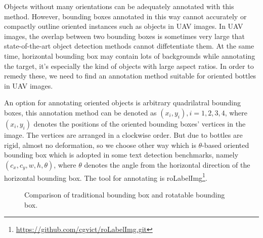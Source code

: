 Objects without many orientations can be adequately annotated with this method. However, bounding boxes annotated in this way cannot accurately or compactly outline oriented instances such as objects in UAV images. In UAV images, the overlap between two bounding boxes is sometimes very large that state-of-the-art object detection methods cannot diffetentiate them\cite{DOTA}. At the same time, horizontal bounding box may contain lots of backgrounds while annotating the target, it's especially the kind of objects with large aspect ratios. In order to remedy these, we need to find an annotation method suitable for oriented bottles in UAV images.

An option for annotating oriented objects is arbitrary quadrilatral bounding boxes, this annotation method can be denoted as ${(x_i, y_i), i=1,2,3,4}$, where $(x_i, y_i)$ denotes the positions of the oriented bounding boxes' vertices in the image\cite{DOTA}. The vertices are arranged in a clockwise order. But due to bottles are rigid, almost no deformation, so we choose other way which is $\theta$-based oriented bounding box which is adopted in some text detection benchmarks, namely $(c_x, c_y, w, h, \theta)$, where $\theta$ denotes the angle from the horizontal direction of the horizontal bounding box\cite{DOTA}. The tool for annotating is roLabelImg\footnote{\url{https://github.com/cgvict/roLabelImg.git}}.

\begin{figure}
	\centering
	\caption{Comparison of traditional bounding box and rotatable bounding box. }
\end{figure}




